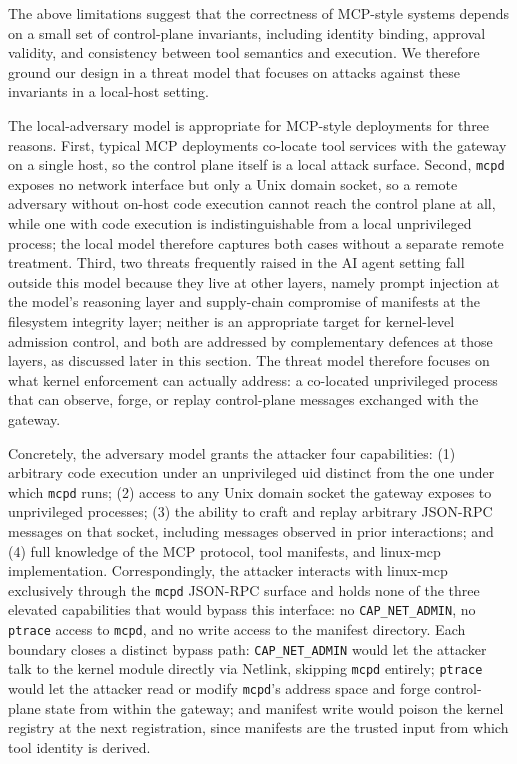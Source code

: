 The above limitations suggest that the correctness of MCP-style systems depends on a small set of control-plane invariants, including identity binding, approval validity, and consistency between tool semantics and execution.
We therefore ground our design in a threat model that focuses on attacks against these invariants in a local-host setting.

The local-adversary model is appropriate for MCP-style deployments for three reasons.
First, typical MCP deployments co-locate tool services with the gateway on a single host, so the control plane itself is a local attack surface.
Second, \texttt{mcpd} exposes no network interface but only a Unix domain socket, so a remote adversary without on-host code execution cannot reach the control plane at all, while one with code execution is indistinguishable from a local unprivileged process; the local model therefore captures both cases without a separate remote treatment.
Third, two threats frequently raised in the AI agent setting fall outside this model because they live at other layers, namely prompt injection at the model's reasoning layer and supply-chain compromise of manifests at the filesystem integrity layer; neither is an appropriate target for kernel-level admission control, and both are addressed by complementary defences at those layers, as discussed later in this section.
The threat model therefore focuses on what kernel enforcement can actually address: a co-located unprivileged process that can observe, forge, or replay control-plane messages exchanged with the gateway.

Concretely, the adversary model grants the attacker four capabilities: (1) arbitrary code execution under an unprivileged uid distinct from the one under which \texttt{mcpd} runs; (2) access to any Unix domain socket the gateway exposes to unprivileged processes; (3) the ability to craft and replay arbitrary JSON-RPC messages on that socket, including messages observed in prior interactions; and (4) full knowledge of the MCP protocol, tool manifests, and linux-mcp implementation.
Correspondingly, the attacker interacts with linux-mcp exclusively through the \texttt{mcpd} JSON-RPC surface and holds none of the three elevated capabilities that would bypass this interface: no \texttt{CAP\_\allowbreak NET\_\allowbreak ADMIN}, no \texttt{ptrace} access to \texttt{mcpd}, and no write access to the manifest directory.
Each boundary closes a distinct bypass path: \texttt{CAP\_\allowbreak NET\_\allowbreak ADMIN} would let the attacker talk to the kernel module directly via Netlink, skipping \texttt{mcpd} entirely; \texttt{ptrace} would let the attacker read or modify \texttt{mcpd}'s address space and forge control-plane state from within the gateway; and manifest write would poison the kernel registry at the next registration, since manifests are the trusted input from which tool identity is derived.

